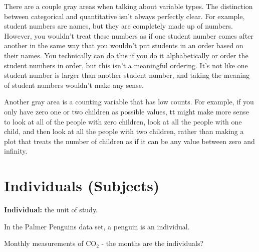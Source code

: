 \documentclass[
  letterpaper,
  DIV=11,
  numbers=noendperiod]{scrreprt}
\begin{document}
There are a couple gray areas when talking about variable types. The
distinction between categorical and quantitative isn't always perfectly
clear. For example, student numbers are names, but they are completely
made up of numbers. However, you wouldn't treat these numbers as if one
student number comes after another in the same way that you wouldn't put
students in an order based on their names. You technically can do this
if you do it alphabetically or order the student numbers in order, but
this isn't a meaningful ordering. It's not like one student number is
larger than another student number, and taking the meaning of student
numbers wouldn't make any sense.

Another gray area is a counting variable that has low counts. For
example, if you only have zero one or two children as possible values,
tt might make more sense to look at all of the people with zero
children, look at all the people with one child, and then look at all
the people with two children, rather than making a plot that treats the
number of children as if it can be any value between zero and infinity.

\hypertarget{individuals-subjects}{%
\section{Individuals (Subjects)}\label{individuals-subjects}}

\textbf{Individual:} the unit of study.

In the Palmer Penguins data set, a penguin is an individual.

\pspace

\begin{tcolorbox}[enhanced jigsaw, opacitybacktitle=0.6, left=2mm, colbacktitle=quarto-callout-warning-color!10!white, colframe=quarto-callout-warning-color-frame, breakable, toptitle=1mm, title=\textcolor{quarto-callout-warning-color}{\faExclamationTriangle}\hspace{0.5em}{CO\(_2\) Measurements}, opacityback=0, bottomrule=.15mm, toprule=.15mm, arc=.35mm, leftrule=.75mm, titlerule=0mm, bottomtitle=1mm, colback=white, rightrule=.15mm, coltitle=black]

Monthly measurements of CO\(_2\) - the months are the individuals?

\end{tcolorbox}
\end{document}
